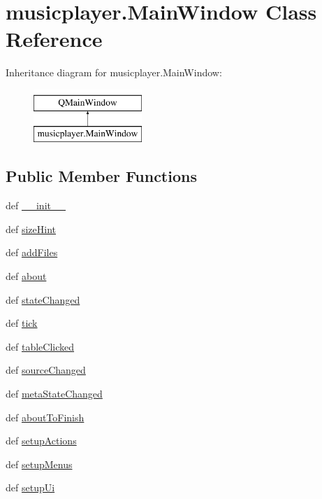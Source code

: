 \hypertarget{classmusicplayer_1_1MainWindow}{}\section{musicplayer.\+Main\+Window Class Reference}
\label{classmusicplayer_1_1MainWindow}
Inheritance diagram for musicplayer.\+Main\+Window\+:\begin{figure}[H]
\begin{center}
\leavevmode
\includegraphics[height=2.000000cm]{classmusicplayer_1_1MainWindow}
\end{center}
\end{figure}
\subsection*{Public Member Functions}
\begin{DoxyCompactItemize}
\item 
def \hyperlink{classmusicplayer_1_1MainWindow_af02724edc1340c1c836140498e1d5ee0}{\+\_\+\+\_\+init\+\_\+\+\_\+}
\item 
def \hyperlink{classmusicplayer_1_1MainWindow_a8f44474330cb89b6245748e733478d6e}{size\+Hint}
\item 
def \hyperlink{classmusicplayer_1_1MainWindow_a80d14c39ec6e009cb26a73b6764aac25}{add\+Files}
\item 
def \hyperlink{classmusicplayer_1_1MainWindow_a939bd30eea760ac50a68ecf15c384adc}{about}
\item 
def \hyperlink{classmusicplayer_1_1MainWindow_a797d8ddec6b51bcc8f7fcbe7fc6f7929}{state\+Changed}
\item 
def \hyperlink{classmusicplayer_1_1MainWindow_a7034b8906c1c269dad7fc8bee9eca66f}{tick}
\item 
def \hyperlink{classmusicplayer_1_1MainWindow_a8c90b960bf7ac2567a7b6c410168f664}{table\+Clicked}
\item 
def \hyperlink{classmusicplayer_1_1MainWindow_abfe7840630bb9e9a729652274243a4d0}{source\+Changed}
\item 
def \hyperlink{classmusicplayer_1_1MainWindow_a60ad2c40d8466c91ee8cdb5550f203db}{meta\+State\+Changed}
\item 
def \hyperlink{classmusicplayer_1_1MainWindow_a80509495333879c8d7d1edea73d55d06}{about\+To\+Finish}
\item 
def \hyperlink{classmusicplayer_1_1MainWindow_af6e924f5937adbc4a7a220944d62ce4f}{setup\+Actions}
\item 
def \hyperlink{classmusicplayer_1_1MainWindow_a626251bc1c61774c8b3421d0be6713c3}{setup\+Menus}
\item 
def \hyperlink{classmusicplayer_1_1MainWindow_ad1da6bdb7068ddf4874b222c7bcbbeec}{setup\+Ui}
\end{DoxyCompactItemize}
